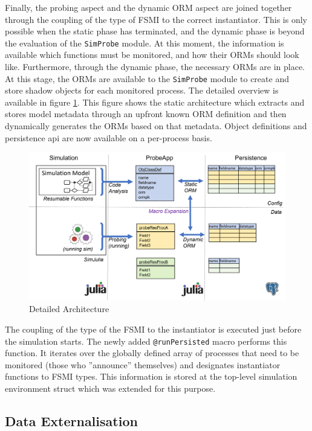 \documentclass{juliacon}
\begin{document}
Finally, the probing aspect and the dynamic ORM aspect are joined together through the coupling of the type of FSMI to the correct instantiator. This is only possible when the static phase has terminated, and the dynamic phase is beyond the evaluation of the \texttt{SimProbe} module. At this moment, the information is available which functions must be monitored, and how their ORMs should look like. Furthermore, through the dynamic phase, the necessary ORMs are in place. At this stage, the ORMs are available to the \texttt{SimProbe} module to create and store shadow objects for each monitored process. The detailed overview is available in figure \ref{fig:detView}. This figure shows the static architecture which extracts and stores model metadata through an upfront known ORM definition and then dynamically generates the ORMs based on that metadata. Object definitions and persistence api are now available on a per-process basis.

\begin{figure}[th]
	\centering
	\includegraphics[width=1\linewidth]{images/overviewArch}
	\caption{Detailed Architecture}
	\label{fig:detView}
\end{figure}

The coupling of the type of the FSMI to the instantiator is executed just before the simulation starts. The newly added \texttt{@runPersisted} macro performs this function. It iterates over the globally defined array of processes that need to be monitored (those who ''announce'' themselves) and designates instantiator functions to FSMI types. This information is stored at the top-level simulation environment struct which was extended for this purpose.\vskip 6pt

\subsection{Data Externalisation}
\end{document}
